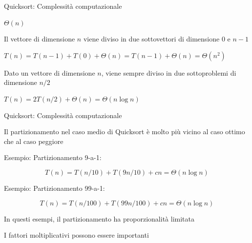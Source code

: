 \begin{frame}{Quicksort: Complessità computazionale}

\vspace{-9pt}
\pause
\BI
\item $\Theta(n)$
\EI

\pause
\BI
\item Il vettore di dimensione $n$ viene diviso in due sottovettori di 
dimensione $0$ e $n-1$
\item $T(n) = T(n-1)+T(0)+\Theta(n) = T(n-1) + \Theta(n) = \Theta(n^2)$
\EI

\pause
\BI
\item Dato un vettore di dimensione $n$, viene sempre diviso in due 
sottoproblemi di dimensione $n/2$
\item $T(n) = 2T(n/2)+\Theta(n) = \Theta(n \log n)$
\EI

\end{frame}

\begin{frame}{Quicksort: Complessità computazionale}

\vspace{-9pt}
\BIL
\item Il partizionamento nel caso medio di Quicksort è molto più vicino al caso ottimo che al caso peggiore
\item Esempio: Partizionamento 9-a-1:	

\vspace{-6pt}
\[T(n) = T(n/10)+T(9n/10)+cn = \Theta(n \log n)\]
\item Esempio: Partizionamento 99-a-1:	

\vspace{-6pt}
\[T(n) = T(n/100)+T(99n/100)+cn  = \Theta(n \log n)\]
\EIL
{}
\BIL
\item In questi esempi, il partizionamento ha proporzionalità limitata
\item I fattori moltiplicativi possono essere importanti
\EIL
\end{frame}


